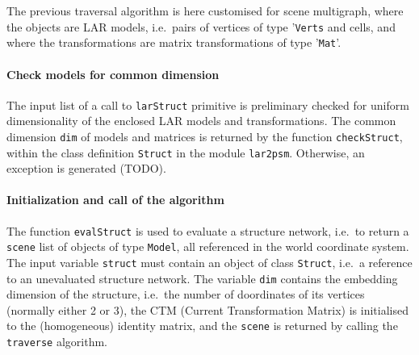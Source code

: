 \documentclass[11pt,oneside]{article}	%
\begin{document}
The previous traversal algorithm is here customised for scene multigraph, where the objects are LAR models, i.e.~pairs of vertices of type '\texttt{Verts} and cells, and where the transformations are matrix transformations of type '\texttt{Mat}'.

\paragraph{Check models for common dimension}
The input list of a call to \texttt{larStruct} primitive is preliminary checked for uniform dimensionality of the enclosed LAR models and transformations. The common dimension \texttt{dim} of models and matrices is returned by the function \texttt{checkStruct}, within the class definition \texttt{Struct} in the module \texttt{lar2psm}. Otherwise, an exception is generated (TODO).

\paragraph{Initialization and call of the algorithm}

The function \texttt{evalStruct} is used to evaluate a structure network, i.e.~to return a \texttt{scene}
list of objects of type \texttt{Model}, all referenced in the world coordinate system. The input variable \texttt{struct} must contain an object of class \texttt{Struct}, i.e.~a reference to an unevaluated structure network. The variable \texttt{dim}  contains the embedding dimension of the structure, i.e.~the number of doordinates of its vertices (normally either 2 or 3), the CTM (Current Transformation Matrix) is initialised to the (homogeneous) identity matrix, and  the \texttt{scene} is returned by calling the \texttt{traverse} algorithm.
\end{document}
